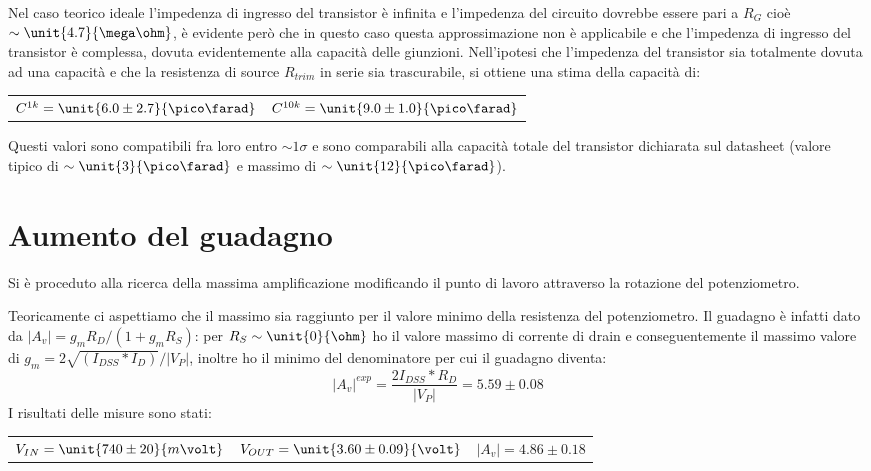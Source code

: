 \documentclass[10pt,a4paper]{article}
\begin{document}
Nel caso teorico ideale l'impedenza di ingresso del transistor è infinita e l'impedenza del circuito dovrebbe essere pari a $R_G$ cioè $\sim\unit{4.7}{\mega\ohm}$, è evidente però che in questo caso questa approssimazione non è applicabile e che l'impedenza di ingresso del transistor è complessa, dovuta evidentemente alla capacità delle giunzioni. Nell'ipotesi che l'impedenza del transistor sia totalmente dovuta ad una capacità e che la resistenza di source $R_{trim}$ in serie sia trascurabile, si ottiene una stima della capacità di:
\begin{table}[h!]
	\centering
	\begin{tabular}{cc}
		$C^{1k} = \unit{6.0 \pm 2.7}{\pico\farad}$ & $C^{10k} = \unit{9.0 \pm 1.0}{\pico\farad}$
	\end{tabular}
\end{table}

Questi valori sono compatibili fra loro entro $\sim 1\sigma$ e sono comparabili alla capacità totale del transistor dichiarata sul datasheet (valore tipico di $\sim \unit{3}{\pico\farad}$ e massimo di $\sim \unit{12}{\pico\farad}$).

\section{Aumento del guadagno}

Si è proceduto alla ricerca della massima amplificazione modificando il punto di lavoro attraverso la rotazione del potenziometro.
    
Teoricamente ci aspettiamo che il massimo sia raggiunto per il valore minimo della resistenza del potenziometro.
Il guadagno è infatti dato da $|A_v| =g_mR_D/(1+g_mR_S)$: per $R_S\sim\unit{0}{\ohm}$ ho il valore massimo di corrente di drain e conseguentemente il massimo valore di $g_m = 2 \sqrt{(I_{DSS}*I_D)}/|V_P|$, inoltre ho il minimo del denominatore per cui il guadagno diventa:
\begin{equation*}
|A_v|^{exp} = \frac{2 I_{DSS}*R_D}{|V_P|} = 5.59 \pm 0.08 
\end{equation*}
I risultati delle misure sono stati:
\begin{table}[h!]
	\centering
	\begin{tabular}{ccc}
		$V_{IN}=\unit{740 \pm 20}{m\volt}$ & $V_{OUT} = \unit{3.60 \pm 0.09}{\volt}$ & $|A_v| = 4.86 \pm 0.18$\\
	\end{tabular}
\end{table}
\end{document}
